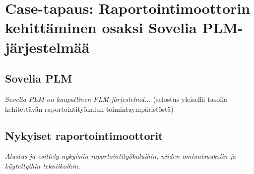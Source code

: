 \chapter{Case-tapaus: Raportointimoottorin kehittäminen osaksi Sovelia PLM-järjestelmää} \label{Case-tapaus: Raportointimoottorin kehittäminen osaksi Sovelia PLM-järjestelmää}

\section{Sovelia PLM} \label{PLM-järjestelmät}

\textit{Sovelia PLM on kaupallinen PLM-järjestelmä...} (selostus yleisellä tasolla kehitettävän raportointityökalun toimintaympäristöstä)

\section{Nykyiset raportointimoottorit}

\textit{Alustus ja esittely nykyisiin raportointityökaluihin, niiden ominaisuuksiin ja käytettyihin tekniikoihin.}
